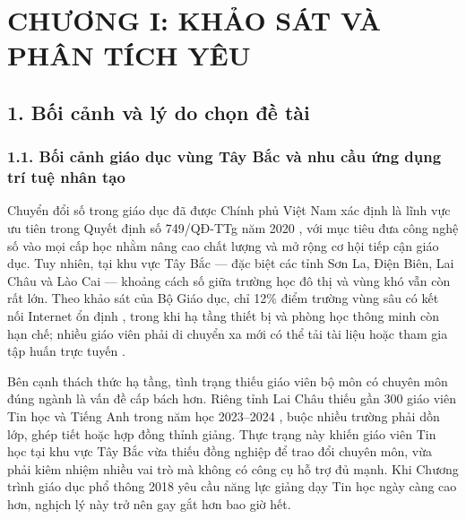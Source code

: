 \documentclass[12pt,a4paper]{article}
\begin{document}
	
	\section*{CHƯƠNG I: KHẢO SÁT VÀ PHÂN TÍCH YÊU}
	
	\subsection*{1. Bối cảnh và lý do chọn đề tài}
	
	\subsubsection*{1.1. Bối cảnh giáo dục vùng Tây Bắc và nhu cầu ứng dụng trí tuệ nhân tạo}
	
	Chuyển đổi số trong giáo dục đã được Chính phủ Việt Nam xác định là lĩnh vực ưu tiên trong Quyết định số 749/QĐ-TTg năm 2020 \cite{qd749}, với mục tiêu đưa công nghệ số vào mọi cấp học nhằm nâng cao chất lượng và mở rộng cơ hội tiếp cận giáo dục. Tuy nhiên, tại khu vực Tây Bắc --- đặc biệt các tỉnh Sơn La, Điện Biên, Lai Châu và Lào Cai --- khoảng cách số giữa trường học đô thị và vùng khó vẫn còn rất lớn. Theo khảo sát của Bộ Giáo dục, chỉ 12\% điểm trường vùng sâu có kết nối Internet ổn định \cite{jvs2025}, trong khi hạ tầng thiết bị và phòng học thông minh còn hạn chế; nhiều giáo viên phải di chuyển xa mới có thể tải tài liệu hoặc tham gia tập huấn trực tuyến \cite{gdtd2025}.
	
	Bên cạnh thách thức hạ tầng, tình trạng thiếu giáo viên bộ môn có chuyên môn đúng ngành là vấn đề cấp bách hơn. Riêng tỉnh Lai Châu thiếu gần 300 giáo viên Tin học và Tiếng Anh trong năm học 2023--2024 \cite{baolao2023}, buộc nhiều trường phải dồn lớp, ghép tiết hoặc hợp đồng thỉnh giảng. Thực trạng này khiến giáo viên Tin học tại khu vực Tây Bắc vừa thiếu đồng nghiệp để trao đổi chuyên môn, vừa phải kiêm nhiệm nhiều vai trò mà không có công cụ hỗ trợ đủ mạnh. Khi Chương trình giáo dục phổ thông 2018 yêu cầu năng lực giảng dạy Tin học ngày càng cao hơn, nghịch lý này trở nên gay gắt hơn bao giờ hết.
	
\end{document}
